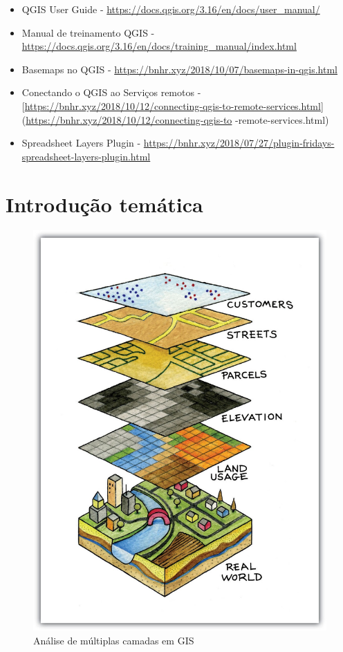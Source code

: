 \documentclass[
  portuguese,
]{krantz}
\providecommand{\tightlist}{%
  \setlength{\itemsep}{0pt}\setlength{\parskip}{0pt}}
\begin{document}
\begin{itemize}
\tightlist
\item
  QGIS User Guide - \url{https://docs.qgis.org/3.16/en/docs/user_manual/}
\item
  Manual de treinamento QGIS - \url{https://docs.qgis.org/3.16/en/docs/training_manual/index.html}
\item
  Basemaps no QGIS - \url{https://bnhr.xyz/2018/10/07/basemaps-in-qgis.html}
\item
  Conectando o QGIS ao Serviços remotos - {[}\url{https://bnhr.xyz/2018/10/12/connecting-qgis-to-remote-services.html}{]} (\url{https://bnhr.xyz/2018/10/12/connecting-qgis-to} -remote-services.html)
\item
  Spreadsheet Layers Plugin - \href{https://bnhr.xyz/2018/\%2027/07\%20/\%20plugin-fridays-spreadsheet-layers-plugin.html}{https://bnhr.xyz/2018/07/27/plugin-fridays-spreadsheet-layers-plugin.html}
\end{itemize}

\hypertarget{introduuxe7uxe3o-temuxe1tica-1}{%
\section{Introdução temática}\label{introduuxe7uxe3o-temuxe1tica-1}}

\begin{figure}
\centering
\includegraphics{media/modulo2/spatial-layers.jpg}
\caption{Análise de múltiplas camadas em GIS}
\end{figure}
\end{document}
